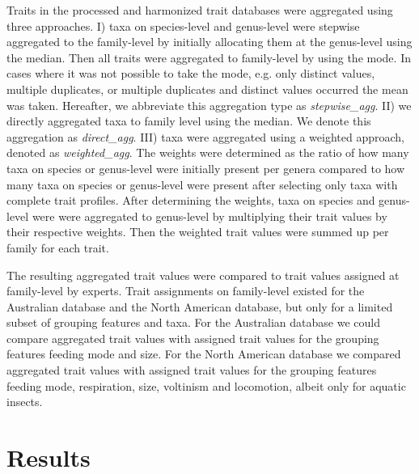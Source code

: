 \documentclass{article}
\begin{document}
Traits in the processed and harmonized trait databases were aggregated using three approaches.
I) taxa on species-level and genus-level were stepwise aggregated to the family-level by initially 
allocating them at the genus-level using the median. Then all traits were aggregated to family-level by using the mode. 
In cases where it was not possible to take the mode, e.g. only distinct values, multiple duplicates, or multiple 
duplicates and distinct values occurred the mean was taken. Hereafter, we abbreviate this aggregation type as \textit{stepwise\_agg}.
II) we directly aggregated taxa to family level using the median. We denote this aggregation as \textit{direct\_agg}.
III) taxa were aggregated using a weighted approach, denoted as \textit{weighted\_agg}. 
The weights were determined as the ratio of how many taxa on species or genus-level were initially present per genera compared to  
how many taxa on species or genus-level were present after selecting only taxa with complete trait profiles. 
After determining the weights, taxa on species and genus-level were were aggregated to genus-level by multiplying their
trait values by their respective weights. Then the weighted trait values were summed up per family for each trait.

The resulting aggregated trait values were compared to trait values assigned at family-level by experts. 
Trait assignments on family-level existed for the Australian database and the North American database, 
but only for a limited subset of grouping features and taxa. For the Australian database we could
compare aggregated trait values with assigned trait values for the grouping features feeding mode and 
size. For the North American database we compared aggregated trait values with assigned trait values for
the grouping features feeding mode, respiration, size, voltinism and locomotion, 
albeit only for aquatic insects. 


\section{Results}

\end{document}
